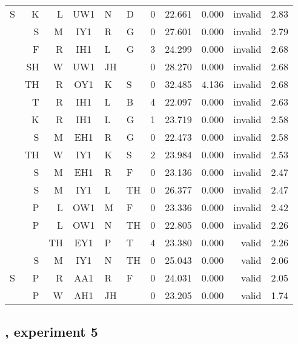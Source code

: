 \documentclass[12pt]{article}
\begin{document}
\begin{longtable}{r@{ }r@{ }r@{ }c@{ }l@{ }l@{ } rrrrr}
S &  K &  L & UW1 & N  & D  &  0 & 22.661 & 0.000 & invalid & 2.83 \\
  &  S &  M & IY1 & R  & G  &  0 & 27.601 & 0.000 & invalid & 2.79 \\
  &  F &  R & IH1 & L  & G  &  3 & 24.299 & 0.000 & invalid & 2.68 \\
  & SH &  W & UW1 & JH &    &  0 & 28.270 & 0.000 & invalid & 2.68 \\
  & TH &  R & OY1 & K  & S  &  0 & 32.485 & 4.136 & invalid & 2.68 \\
  &  T &  R & IH1 & L  & B  &  4 & 22.097 & 0.000 & invalid & 2.63 \\
  &  K &  R & IH1 & L  & G  &  1 & 23.719 & 0.000 & invalid & 2.58 \\
  &  S &  M & EH1 & R  & G  &  0 & 22.473 & 0.000 & invalid & 2.58 \\
  & TH &  W & IY1 & K  & S  &  2 & 23.984 & 0.000 & invalid & 2.53 \\
  &  S &  M & EH1 & R  & F  &  0 & 23.136 & 0.000 & invalid & 2.47 \\
  &  S &  M & IY1 & L  & TH &  0 & 26.377 & 0.000 & invalid & 2.47 \\
  &  P &  L & OW1 & M  & F  &  0 & 23.336 & 0.000 & invalid & 2.42 \\
  &  P &  L & OW1 & N  & TH &  0 & 22.805 & 0.000 & invalid & 2.26 \\
  &    & TH & EY1 & P  & T  &  4 & 23.380 & 0.000 &   valid & 2.26 \\
  &  S &  M & IY1 & N  & TH &  0 & 25.043 & 0.000 &   valid & 2.06 \\
S &  P &  R & AA1 & R  & F  &  0 & 24.031 & 0.000 &   valid & 2.05 \\
  &  P &  W & AH1 & JH &    &  0 & 23.205 & 0.000 &   valid & 1.74 \\
\bottomrule
\end{longtable}

\subsection{\citet{Scholes1966}, experiment 5}    
\end{document}
